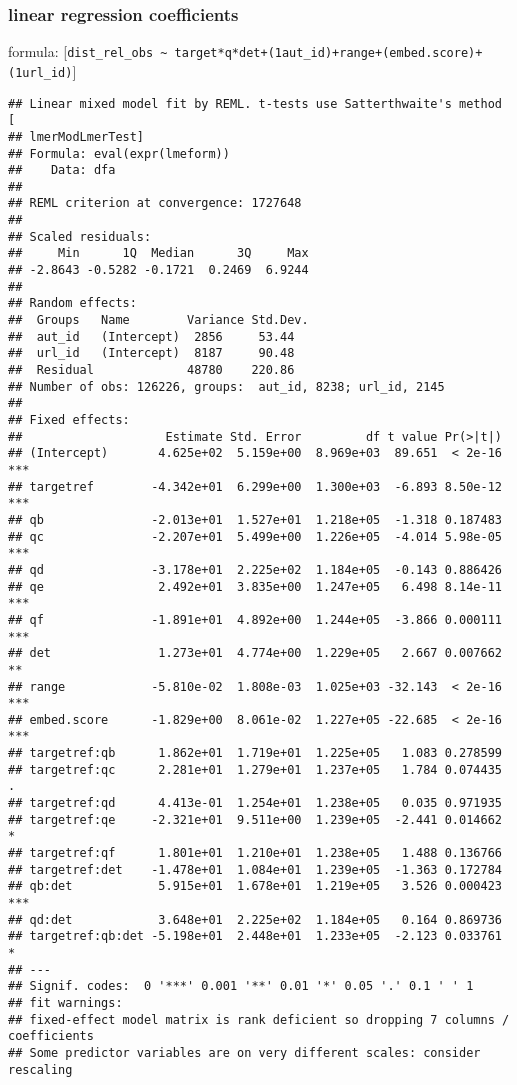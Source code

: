 \documentclass[
  12pt,
  oneside]{book}
\begin{document}
\subsubsection{linear regression coefficients}\label{linear-regression-coefficients}

formula: {[}\texttt{dist\_rel\_obs\ \textasciitilde{}\ target*q*det+(1\textbar{}aut\_id)+range+(embed.score)+(1\textbar{}url\_id)}{]}

\begin{verbatim}
## Linear mixed model fit by REML. t-tests use Satterthwaite's method [
## lmerModLmerTest]
## Formula: eval(expr(lmeform))
##    Data: dfa
## 
## REML criterion at convergence: 1727648
## 
## Scaled residuals: 
##     Min      1Q  Median      3Q     Max 
## -2.8643 -0.5282 -0.1721  0.2469  6.9244 
## 
## Random effects:
##  Groups   Name        Variance Std.Dev.
##  aut_id   (Intercept)  2856     53.44  
##  url_id   (Intercept)  8187     90.48  
##  Residual             48780    220.86  
## Number of obs: 126226, groups:  aut_id, 8238; url_id, 2145
## 
## Fixed effects:
##                    Estimate Std. Error         df t value Pr(>|t|)    
## (Intercept)       4.625e+02  5.159e+00  8.969e+03  89.651  < 2e-16 ***
## targetref        -4.342e+01  6.299e+00  1.300e+03  -6.893 8.50e-12 ***
## qb               -2.013e+01  1.527e+01  1.218e+05  -1.318 0.187483    
## qc               -2.207e+01  5.499e+00  1.226e+05  -4.014 5.98e-05 ***
## qd               -3.178e+01  2.225e+02  1.184e+05  -0.143 0.886426    
## qe                2.492e+01  3.835e+00  1.247e+05   6.498 8.14e-11 ***
## qf               -1.891e+01  4.892e+00  1.244e+05  -3.866 0.000111 ***
## det               1.273e+01  4.774e+00  1.229e+05   2.667 0.007662 ** 
## range            -5.810e-02  1.808e-03  1.025e+03 -32.143  < 2e-16 ***
## embed.score      -1.829e+00  8.061e-02  1.227e+05 -22.685  < 2e-16 ***
## targetref:qb      1.862e+01  1.719e+01  1.225e+05   1.083 0.278599    
## targetref:qc      2.281e+01  1.279e+01  1.237e+05   1.784 0.074435 .  
## targetref:qd      4.413e-01  1.254e+01  1.238e+05   0.035 0.971935    
## targetref:qe     -2.321e+01  9.511e+00  1.239e+05  -2.441 0.014662 *  
## targetref:qf      1.801e+01  1.210e+01  1.238e+05   1.488 0.136766    
## targetref:det    -1.478e+01  1.084e+01  1.239e+05  -1.363 0.172784    
## qb:det            5.915e+01  1.678e+01  1.219e+05   3.526 0.000423 ***
## qd:det            3.648e+01  2.225e+02  1.184e+05   0.164 0.869736    
## targetref:qb:det -5.198e+01  2.448e+01  1.233e+05  -2.123 0.033761 *  
## ---
## Signif. codes:  0 '***' 0.001 '**' 0.01 '*' 0.05 '.' 0.1 ' ' 1
## fit warnings:
## fixed-effect model matrix is rank deficient so dropping 7 columns / coefficients
## Some predictor variables are on very different scales: consider rescaling
\end{verbatim}
\end{document}
